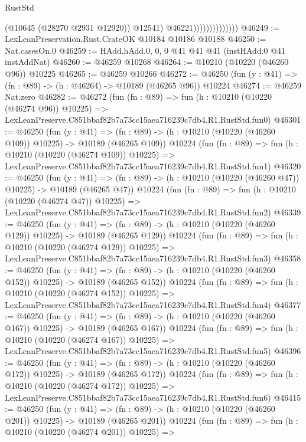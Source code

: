 \begin{lexlean}{RustStd}
\begin{coremodule}
                                  (@10645 (@28270 @2931 @12920))
                                  @12541)
                                @46221))))))))))))))
@46249 := LexLeanPreservation.Rust.CrateOK @10184 @10186 @10188
@46250 := Nat.casesOn.{0}
@46259 := HAdd.hAdd.{0, 0, 0} @41 @41 @41 (instHAdd.{0} @41 instAddNat)
@46260 := @46259 @10268
@46264 := @10210 (@10220 (@46260 @96)) @10225
@46265 := @46259 @10266
@46272 := @46250 (fun (y : @41) => (fn : @89) -> (h : @46264) -> @10189 (@46265 @96)) @10224
@46274 := @46259 Nat.zero
@46282 := @46272
    (fun (fn : @89) =>
    fun (h : @10210 (@10220 (@46274 @96)) @10225) =>
    LexLeanPreserve.C851bbaf82b7a73cc15aea716239c7db4.R1.RustStd.fun0)
@46301 := @46250
    (fun (y : @41) =>
    (fn : @89) -> (h : @10210 (@10220 (@46260 @109)) @10225) -> @10189 (@46265 @109))
    @10224
    (fun (fn : @89) =>
    fun (h : @10210 (@10220 (@46274 @109)) @10225) =>
    LexLeanPreserve.C851bbaf82b7a73cc15aea716239c7db4.R1.RustStd.fun1)
@46320 := @46250
    (fun (y : @41) =>
    (fn : @89) -> (h : @10210 (@10220 (@46260 @47)) @10225) -> @10189 (@46265 @47))
    @10224
    (fun (fn : @89) =>
    fun (h : @10210 (@10220 (@46274 @47)) @10225) =>
    LexLeanPreserve.C851bbaf82b7a73cc15aea716239c7db4.R1.RustStd.fun2)
@46339 := @46250
    (fun (y : @41) =>
    (fn : @89) -> (h : @10210 (@10220 (@46260 @129)) @10225) -> @10189 (@46265 @129))
    @10224
    (fun (fn : @89) =>
    fun (h : @10210 (@10220 (@46274 @129)) @10225) =>
    LexLeanPreserve.C851bbaf82b7a73cc15aea716239c7db4.R1.RustStd.fun3)
@46358 := @46250
    (fun (y : @41) =>
    (fn : @89) -> (h : @10210 (@10220 (@46260 @152)) @10225) -> @10189 (@46265 @152))
    @10224
    (fun (fn : @89) =>
    fun (h : @10210 (@10220 (@46274 @152)) @10225) =>
    LexLeanPreserve.C851bbaf82b7a73cc15aea716239c7db4.R1.RustStd.fun4)
@46377 := @46250
    (fun (y : @41) =>
    (fn : @89) -> (h : @10210 (@10220 (@46260 @167)) @10225) -> @10189 (@46265 @167))
    @10224
    (fun (fn : @89) =>
    fun (h : @10210 (@10220 (@46274 @167)) @10225) =>
    LexLeanPreserve.C851bbaf82b7a73cc15aea716239c7db4.R1.RustStd.fun5)
@46396 := @46250
    (fun (y : @41) =>
    (fn : @89) -> (h : @10210 (@10220 (@46260 @172)) @10225) -> @10189 (@46265 @172))
    @10224
    (fun (fn : @89) =>
    fun (h : @10210 (@10220 (@46274 @172)) @10225) =>
    LexLeanPreserve.C851bbaf82b7a73cc15aea716239c7db4.R1.RustStd.fun6)
@46415 := @46250
    (fun (y : @41) =>
    (fn : @89) -> (h : @10210 (@10220 (@46260 @201)) @10225) -> @10189 (@46265 @201))
    @10224
    (fun (fn : @89) =>
    fun (h : @10210 (@10220 (@46274 @201)) @10225) =>

\end{coremodule}
\end{lexlean}
